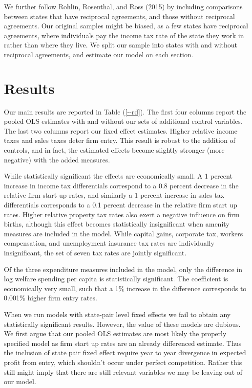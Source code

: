 \documentclass[12pt,a4paper]{article}
\begin{document}
We further follow Rohlin, Rosenthal, and Ross (2015) by including comparisons between states that have reciprocal agreements, and those without reciprocal agreements. Our original samples might be biased, as a few states have reciprocal agreements, where individuals pay the income tax rate of the state they work in rather than where they live. We split our sample into states with and without reciprocal agreements, and estimate our model on each section.
\section{Results}

Our main results are reported in Table (\ref{--rd}). The first four columns report the pooled OLS estimates with and without our sets of additional control variables. The last two columns report our fixed effect estimates. Higher relative income taxes and sales taxes deter firm entry.  This result is robust to the addition of controls, and in fact, the estimated effects become slightly stronger (more negative) with the added measures.  

While statistically significant the effects are economically small.  A 1 percent increase in income tax differentials correspond to a 0.8 percent decrease in the relative firm start up rates, and similarly a 1 percent increase in sales tax differentials corresponds to a 0.1 percent decrease in the relative firm start up rates.  Higher relative property tax rates also exert a negative influence on firm births, although this effect becomes statistically insignificant when amenity measures are included in the model. While capital gains, corporate tax, workers compensation, and unemployment insurance tax rates are individually insignificant, the set of seven tax rates are jointly  significant. 

Of the three expenditure measures included in the model, only the difference in log welfare spending per capita is statistically significant. The coefficient is economically very small, such that a 1\% increase in the difference corresponds to 0.001\% higher firm entry rates.

When we run models with state-pair level fixed effects we fail to obtain any statistically significant results. However, the value of these models are dubious. We first argue that our pooled OLS estimates are most likely the properly specified model as firm start up rates are an already differenced estimate. Thus the inclusion of state pair fixed effect require year to year divergence in expected profit from entry, which shouldn’t occur under perfect competition. Rather this still might imply that there are still relevant variables we may be leaving out of our model.
\end{document}

